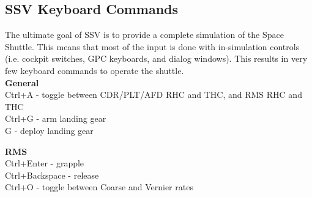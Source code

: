 \documentclass[Space_Shuttle_Vessel_Manual.tex]{subfiles}
\begin{document}
\subsection{SSV Keyboard Commands}
\begin{multicols*}{2}
The ultimate goal of SSV is to provide a complete simulation of the Space Shuttle.  This means that most of the input is done with in-simulation controls (i.e. cockpit switches, GPC keyboards, and dialog windows). This results in very few keyboard commands to operate the shuttle.\\

\textbf{General}\\
Ctrl+A - toggle between CDR/PLT/AFD RHC and THC, and RMS RHC and THC\\
Ctrl+G - arm landing gear\\
G - deploy landing gear\\
\vspace{\baselineskip}

\textbf{RMS}\\
Ctrl+Enter - grapple\\
Ctrl+Backspace - release\\
Ctrl+O - toggle between Coarse and Vernier rates\\


\end{multicols*}
\end{document}
